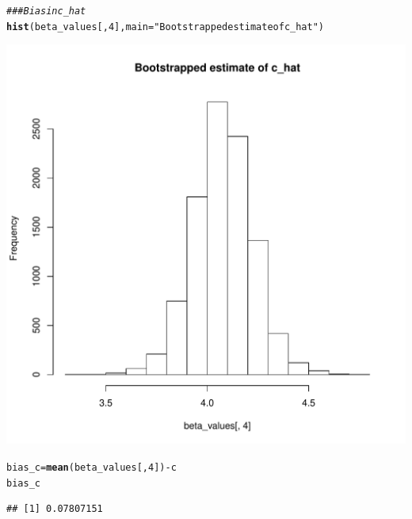 \documentclass[11pt]{article}\usepackage[]{graphicx}\usepackage[]{color}
\makeatletter
\def\maxwidth{ %
  \ifdim\Gin@nat@width>\linewidth
    \linewidth
  \else
    \Gin@nat@width
  \fi
}
\newcommand{\hlnum}[1]{\textcolor[rgb]{0.686,0.059,0.569}{#1}}%
\newcommand{\hlstr}[1]{\textcolor[rgb]{0.192,0.494,0.8}{#1}}%
\newcommand{\hlcom}[1]{\textcolor[rgb]{0.678,0.584,0.686}{\textit{#1}}}%
\newcommand{\hlopt}[1]{\textcolor[rgb]{0,0,0}{#1}}%
\newcommand{\hlstd}[1]{\textcolor[rgb]{0.345,0.345,0.345}{#1}}%
\newcommand{\hlkwb}[1]{\textcolor[rgb]{0.69,0.353,0.396}{#1}}%
\newcommand{\hlkwc}[1]{\textcolor[rgb]{0.333,0.667,0.333}{#1}}%
\newcommand{\hlkwd}[1]{\textcolor[rgb]{0.737,0.353,0.396}{\textbf{#1}}}%
\newenvironment{kframe}{%
 \def\at@end@of@kframe{}%
 \ifinner\ifhmode%
  \def\at@end@of@kframe{\end{minipage}}%
  \begin{minipage}{\columnwidth}%
 \fi\fi%
 \def\FrameCommand##1{\hskip\@totalleftmargin \hskip-\fboxsep
 \colorbox{shadecolor}{##1}\hskip-\fboxsep
     \hskip-\linewidth \hskip-\@totalleftmargin \hskip\columnwidth}%
 \MakeFramed {\advance\hsize-\width
   \@totalleftmargin\z@ \linewidth\hsize
   \@setminipage}}%
 {\par\unskip\endMakeFramed%
 \at@end@of@kframe}
\newenvironment{knitrout}{}{} %
\makeatother
\begin{document}
\begin{knitrout}
\color{fgcolor}\begin{kframe}
\begin{alltt}
\hlcom{## # Bias in c_hat}
\hlkwd{hist}\hlstd{(beta_values[,}\hlnum{4}\hlstd{],} \hlkwc{main} \hlstd{=} \hlstr{"Bootstrapped estimate of c_hat"}\hlstd{)}
\end{alltt}
\end{kframe}
\includegraphics[width=\maxwidth]{figure/unnamed-chunk-8-1} 
\begin{kframe}\begin{alltt}
\hlstd{bias_c} \hlkwb{=} \hlkwd{mean}\hlstd{(beta_values[,}\hlnum{4}\hlstd{])}\hlopt{-}\hlstd{c}
\hlstd{bias_c}
\end{alltt}
\begin{lstlisting}[basicstyle=\ttfamily,breaklines=true]
## [1] 0.07807151
\end{lstlisting}
\end{kframe}
\end{knitrout}
\end{document}
